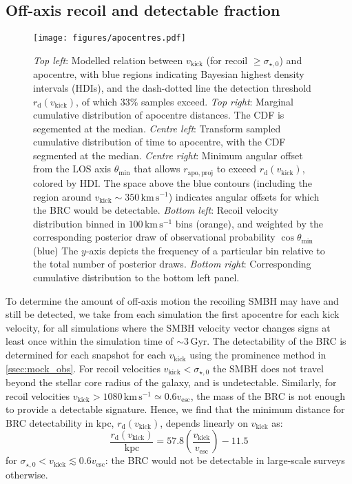 \documentclass[twocolumn]{aastex631}
\newcommand{\kmps}{\ensuremath{\mathrm{km}\,\mathrm{s}^{-1}} }%
\newcommand{\rapop}{\ensuremath{r_\mathrm{apo,proj}}}         %
\newcommand{\vk}{\ensuremath{v_\mathrm{kick}}}                %
\newcommand{\sigcore}{\ensuremath{\sigma_{\star,0}}}          %
\newcommand{\rdetect}{\ensuremath{r_\mathrm{d}(\vk)}}         %
\begin{document}
\subsection{Off-axis recoil and detectable fraction}\label{ssec:offaxis}
\begin{figure*}[t]
    \centering
    \texttt{[image: figures/apocentres.pdf]}
    \caption{
        \textit{Top left}: Modelled relation between $\vk$ (for recoil $\geq \sigcore$) and apocentre, with blue regions indicating Bayesian highest density intervals (HDIs), and the dash-dotted line the detection threshold $\rdetect$, of which 33\% samples exceed.
        \textit{Top right}: Marginal cumulative distribution of apocentre distances.
        The CDF is segemented at the median.
        \textit{Centre left}: Transform sampled cumulative distribution of time to apocentre, with the CDF segmented at the median.
        \textit{Centre right}: Minimum angular offset from the LOS axis $\theta_\mathrm{min}$ that allows $\rapop$ to exceed $\rdetect$, colored by HDI.
        The space above the blue contours (including the region around $\vk\sim 350\,\kmps$) indicates angular offsets for which the BRC would be detectable.
        \textit{Bottom left}: Recoil velocity distribution binned in $100\,\kmps$ bins (orange), and weighted by the corresponding posterior draw of observational probability $\cos\theta_\mathrm{min}$ (blue)
        The $y$-axis depicts the frequency of a particular bin relative to the total number of posterior draws.
        \textit{Bottom right}: Corresponding cumulative distribution to the bottom left panel.
    }
    \label{fig:apos}
\end{figure*}
To determine the amount of off-axis motion the recoiling SMBH may have and still be detected, we take from each simulation the first apocentre for each kick velocity, for all simulations where the SMBH velocity vector changes signs at least once within the simulation time of $\sim3\,\mathrm{Gyr}$.
The detectability of the BRC is determined for each snapshot for each $\vk$ using the prominence method in \autoref{ssec:mock_obs}. 
For recoil velocities $\vk < \sigcore$ the SMBH does not travel beyond the stellar core radius of the galaxy, and is undetectable.
Similarly, for recoil velocities $\vk > 1080\,\kmps \simeq 0.6v_\mathrm{esc}$, the mass of the BRC is not enough to provide a detectable signature.
Hence, we find that the minimum  distance for BRC detectability in kpc, $\rdetect$, depends linearly on $\vk$ as:
\begin{equation}
    \frac{\rdetect}{\mathrm{kpc}} = 57.8 \left(\frac{\vk}{v_\mathrm{esc}}\right) - 11.5
\end{equation}
for $\sigcore < \vk \lesssim 0.6v_\mathrm{esc}$: the BRC would not be detectable in large-scale surveys otherwise.
\end{document}
